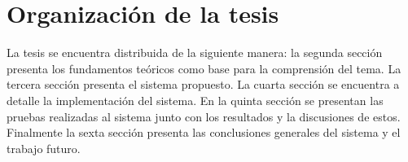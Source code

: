 \section{Organizaci\'on de la tesis}\label{sec:OrganizacionTesis}
La tesis se encuentra distribuida de la siguiente manera: la segunda sección presenta los fundamentos teóricos como base para la comprensión del tema. La tercera sección presenta el sistema propuesto. La cuarta sección se encuentra a detalle la implementación del sistema. En la quinta sección se presentan las pruebas realizadas al sistema junto con los resultados y la discusiones de estos. Finalmente la sexta sección presenta las conclusiones generales del sistema y el trabajo futuro. 
	



\newpage









